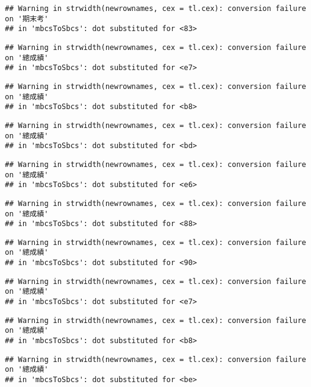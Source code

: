 \documentclass[
]{book}
\begin{document}
\begin{verbatim}
## Warning in strwidth(newrownames, cex = tl.cex): conversion failure on '期末考'
## in 'mbcsToSbcs': dot substituted for <83>
\end{verbatim}

\begin{verbatim}
## Warning in strwidth(newrownames, cex = tl.cex): conversion failure on '總成績'
## in 'mbcsToSbcs': dot substituted for <e7>
\end{verbatim}

\begin{verbatim}
## Warning in strwidth(newrownames, cex = tl.cex): conversion failure on '總成績'
## in 'mbcsToSbcs': dot substituted for <b8>
\end{verbatim}

\begin{verbatim}
## Warning in strwidth(newrownames, cex = tl.cex): conversion failure on '總成績'
## in 'mbcsToSbcs': dot substituted for <bd>
\end{verbatim}

\begin{verbatim}
## Warning in strwidth(newrownames, cex = tl.cex): conversion failure on '總成績'
## in 'mbcsToSbcs': dot substituted for <e6>
\end{verbatim}

\begin{verbatim}
## Warning in strwidth(newrownames, cex = tl.cex): conversion failure on '總成績'
## in 'mbcsToSbcs': dot substituted for <88>
\end{verbatim}

\begin{verbatim}
## Warning in strwidth(newrownames, cex = tl.cex): conversion failure on '總成績'
## in 'mbcsToSbcs': dot substituted for <90>
\end{verbatim}

\begin{verbatim}
## Warning in strwidth(newrownames, cex = tl.cex): conversion failure on '總成績'
## in 'mbcsToSbcs': dot substituted for <e7>
\end{verbatim}

\begin{verbatim}
## Warning in strwidth(newrownames, cex = tl.cex): conversion failure on '總成績'
## in 'mbcsToSbcs': dot substituted for <b8>
\end{verbatim}

\begin{verbatim}
## Warning in strwidth(newrownames, cex = tl.cex): conversion failure on '總成績'
## in 'mbcsToSbcs': dot substituted for <be>
\end{verbatim}
\end{document}
